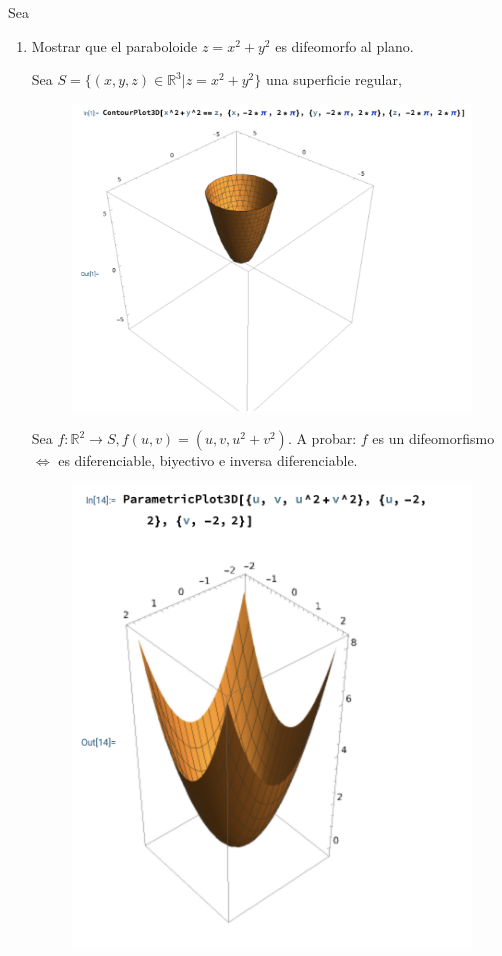 \begin{problema}
    Sea 
    \begin{enumerate}
        \item Mostrar que el paraboloide $z=x^2+y^2$ es difeomorfo al plano.
        \begin{sol}
            Sea $S=\{(x,y,z)\in \mathbb{R}^3| z=x^2+y^2\}$ una superficie regular, 
            \begin{figure}[H]
                \centering 
                \includegraphics[scale=0.5]{imagenes/2.png}
            \end{figure}
            Sea $f:\mathbb{R}^2\to S, f(u,v)=(u,v,u^2+v^2)$. A probar: $f$ es un difeomorfismo $\iff$ es diferenciable, biyectivo e inversa diferenciable.
            \begin{figure}[H]
                \centering 
                \includegraphics[scale=0.5]{imagenes/3.png}

\end{figure}
\end{sol}
\end{enumerate}
\end{problema}
